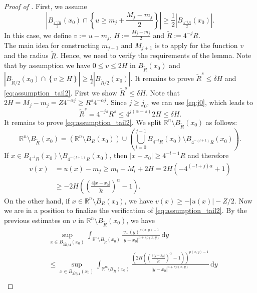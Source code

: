 \documentclass[10pt,a4paper]{amsart}
\newcommand{\R}{\mathbb{R}}
\begin{document}
\begin{proof} [Proof of ]
First, we assume 
\begin{equation}\label{eq:Hoeldcase1}
 \left| B_{\frac{4^{-j}R}{2}}(x_0) \cap \left\{ u\geq m_{j} + \frac{M_j-m_j}{2} \right\} \right| \geq \frac{1}{2}\left| B_{\frac{4^{-j}R}{2}}(x_0) \right|. 
\end{equation}
In this case, we define $v:=u-m_j$, $H:=\frac{M_j-m_j}{2}$ and $\widetilde{R}:=4^{-j}R$. \\
The main idea for constructing $m_{j+1}$ and $M_{j+1}$ is to apply  for the function $v$ and the radius $\widetilde{R}$. Hence, we need to verify the requirements of the lemma.
Note that by assumption we have $0\leq v\leq 2H$ in $B_{\widetilde{R}}(x_0)$ and  $| B_{\widetilde{R}/2}(x_0) \cap \left\{ v\geq H \right\} | \geq \frac{1}{2}| B_{\widetilde{R}/2}(x_0)|.$ It remains to prove $\widetilde{R}^s\leq \delta H$ and \eqref{eq:assumption_tail2}. First we show $\widetilde{R}^s\leq \delta H$. Note that $2H = M_j - m_j = Z4^{-\alpha j} \geq R^s 4^{-\alpha j}$. Since $j\geq j_0$, we can use \eqref{eq:j0}, which leads to
\[ \widetilde{R}^s = 4^{-js} R^s \leq  4^{j(\alpha-s)}2H \leq \delta H.\]
It remains to prove \eqref{eq:assumption_tail2}. We split $\R^n\setminus B_{\widetilde{R}}(x_0)$ as follows:
\[ \R^n\setminus B_{\widetilde{R}}(x_0) = \left(\R^n\setminus B_R(x_0)\right) \cup \left(\bigcup_{l=0}^{j-1} B_{4^{-l}R}(x_0) \setminus B_{4^{-(l+1)}R}(x_0)\right). \]
If $x\in B_{4^{-l}R}(x_0) \setminus B_{4^{-(l+1)}R}(x_0)$, then $|x-x_0|\geq 4^{-l-1}R$ and therefore
\begin{align*}
v(x) &= u(x)-m_j \geq m_l-M_l + 2H  = 2H(-4^{(-l+j)\alpha}+1) \\
& \geq -2H\left(\left( \frac{4|x-x_0|}{\widetilde{R}} \right)^{\alpha}-1\right). 
\end{align*}
On the other hand, if $x\in \R^n\setminus B_R(x_0)$, we have $v(x) \geq -|u(x)|-Z/2$.
 Now we are in a position to finalize the verification of \eqref{eq:assumption_tail2}. By the previous estimates on $v$ in $\R^n\setminus B_{\widetilde{R}}(x_0)$, we have
\begin{align*}
&\sup_{x \in B_{3\widetilde{R}/4}(x_0)} \int_{\mathbb{R}^n \setminus B_{\widetilde{R}}(x_0)} \frac{v_-(y)^{p(x,y)-1}}{|y-x_0|^{n+sp(x,y)}} \,\mathrm{d}y \\
&\leq \sup_{x \in B_{3\widetilde{R}/4}(x_0)} \int_{\R^n \setminus B_{\widetilde{R}}(x_0)} \frac{\left(2H\left(\left( \frac{4|y-x_0|}{\widetilde{R}} \right)^{\alpha}-1\right)\right)^{p(x,y)-1} }{|y-x_0|^{n+sp(x,y)}} \,\mathrm{d}y  \\

\end{align*}
\end{proof}
\end{document}
